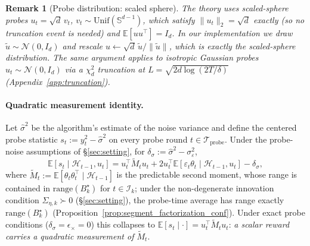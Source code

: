 \documentclass{article}
\newcommand{\E}{\mathbb{E}}
\newcommand{\cH}{\mathcal{H}}
\newcommand{\cI}{\mathcal{I}}
\newcommand{\cTprobe}{\mathcal{T}_{\mathrm{probe}}}
\newcommand{\range}{\mathrm{range}}
\newtheorem{remark}[theorem]{Remark}
\begin{document}
\begin{remark}[Probe distribution: scaled sphere]
\label{rem:subgauss_probe}
The theory uses scaled-sphere probes
$u_t = \sqrt d\,v_t$, $v_t\sim\mathrm{Unif}(\mathbb S^{d-1})$, which
satisfy $\|u_t\|_2 = \sqrt d$ \emph{exactly} (so no truncation event
is needed) and $\E[uu^\top] = I_d$. In our implementation we draw
$\tilde u\sim\mathcal N(0,I_d)$ and rescale
$u\leftarrow \sqrt d\,\tilde u/\|\tilde u\|$, which is exactly the
scaled-sphere distribution. The same argument applies to isotropic
Gaussian probes $u_t\sim\mathcal N(0,I_d)$ via a $\chi^2_d$
truncation at $L=\sqrt{2d\log(2T/\delta)}$
(Appendix~\ref{app:truncation}).
\end{remark}

\paragraph{Quadratic measurement identity.}
Let $\widehat\sigma^2$ be the algorithm's estimate of the noise variance
and define the centered probe statistic $s_t := y_t^2 - \widehat\sigma^2$
on every probe round $t\in\cTprobe$. Under the probe-noise
assumptions of \S\ref{sec:setting}, for
$\delta_\sigma := \widehat\sigma^2-\sigma_\varepsilon^2$,
\begin{equation}
\E[s_t \mid \cH_{t-1},u_t]
  = u_t^\top \widetilde{M}_t u_t + 2 u_t^\top
    \E[\varepsilon_t\theta_t\mid\cH_{t-1},u_t] - \delta_\sigma,
\label{eq:quad_identity}
\end{equation}
where $\widetilde{M}_t := \E[\theta_t\theta_t^\top\mid \cH_{t-1}]$
is the predictable second moment, whose range is contained in
$\range(B_k^\star)$ for $t\in\cI_k$; under the non-degenerate
innovation condition $\Sigma_{\eta,k}\succ 0$ (\S\ref{sec:setting}),
the probe-time average has range exactly $\range(B_k^\star)$
(Proposition~\ref{prop:segment_factorization_conf}). Under exact probe conditions
($\delta_\sigma = \epsilon_\times = 0$) this collapses to
$\E[s_t\mid\cdot] = u_t^\top\widetilde M_t u_t$: \emph{a scalar reward
carries a quadratic measurement of $\widetilde M_t$}.
\end{document}
